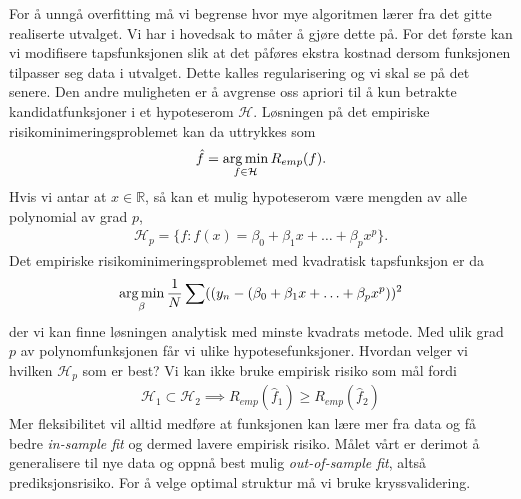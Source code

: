 For å unngå overfitting må vi begrense hvor mye algoritmen lærer fra det gitte realiserte utvalget. Vi har i hovedsak to måter å gjøre dette på. For det første kan vi modifisere tapsfunksjonen slik at det påføres ekstra kostnad dersom funksjonen tilpasser seg data i utvalget. Dette kalles regularisering og vi skal se på det senere. Den andre muligheten er å avgrense oss apriori til å kun betrakte kandidatfunksjoner i et hypoteserom $\mathcal{H}$. Løsningen på det empiriske risikominimeringsproblemet kan da uttrykkes som
\begin{align}
\hat{f} = \operatorname*{arg\,min}_{f \in \mathcal{H}} R_{emp}(f).
\end{align}
Hvis vi antar at $x\in\mathbb{R}$, så kan et mulig hypoteserom være mengden av alle polynomial av grad $p$,
\begin{align}
\mathcal{H}_p = \{f:f(x)=\beta_0 +\beta_1x+\ldots+\beta_p x^p\}.
\end{align}
Det empiriske risikominimeringsproblemet med kvadratisk tapsfunksjon er da
\begin{align}
\operatorname*{arg\,min}_{\beta} \frac{1}{N}\sum ((y_n-(\beta_0 +\beta_1x+\ldots+\beta_p x^p))^2
\end{align}
der vi kan finne løsningen analytisk med minste kvadrats metode. Med ulik grad $p$ av polynomfunksjonen får vi ulike hypotesefunksjoner. Hvordan velger vi hvilken $\mathcal{H}_p$ som er best? Vi kan ikke bruke empirisk risiko som mål fordi
\begin{align}
\mathcal{H}_1 \subset \mathcal{H}_2 \implies R_{emp}(\hat{f}_1) \geq R_{emp}(\hat{f}_2) 
\end{align}
Mer fleksibilitet vil alltid medføre at funksjonen kan lære mer fra data og få bedre \textit{in-sample fit} og dermed lavere empirisk risiko. Målet vårt er derimot å generalisere til nye data og oppnå best mulig \textit{out-of-sample fit}, altså prediksjonsrisiko. For å velge optimal struktur må vi bruke kryssvalidering.

